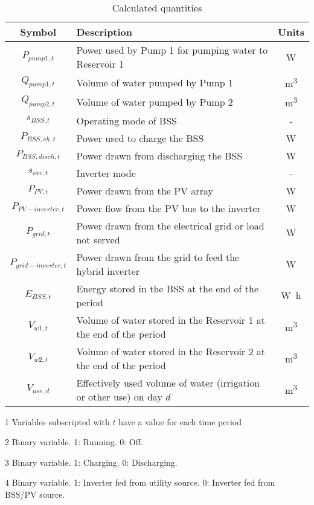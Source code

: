 \begin{table}[htb]
	\begin{threeparttable}[b]
		\caption{Calculated quantities}
		\label{table:calculated}
		\begin{tabular}{cp{}c}
			\toprule 
			Symbol & Description & Units \\
			\midrule
			$P_{pump1,t}$ & Power used by Pump 1 for pumping water to Reservoir 1 & \si{W} \\
			$Q_{pump1,t}$ & Volume of water pumped by Pump 1 & \si{m^3} \\
			$Q_{pump2,t}$ & Volume of water pumped by Pump 2 & \si{m^3} \\
			$s_{BSS,t}$ & Operating mode of BSS\tnote{3} & - \\
			$P_{BSS,ch,t}$ & Power used to charge the BSS & \si{W} \\
			$P_{BSS,disch,t}$ & Power drawn from discharging the BSS & \si{W} \\
			$s_{inv,t}$ & Inverter mode\tnote{4} & - \\
			$P_{PV,t}$ & Power drawn from the PV array & \si{W} \\
			$P_{PV-inverter,t}$ & Power flow from the PV bus to the inverter & \si{W} \\
			$P_{grid,t}$ & Power drawn from the electrical grid or load not served & \si{W} \\
			$P_{grid-inverter,t}$ & Power drawn from the grid to feed the hybrid inverter & \si{W} \\
			$E_{BSS,t}$ & Energy stored in the BSS at the end of the period & \si{W h} \\
			$V_{w1,t}$ & Volume of water stored in the Reservoir 1 at the end of the period & \si{m^3} \\
			$V_{w2,t}$ & Volume of water stored in the Reservoir 2 at the end of the period & \si{m^3} \\
			$V_{use,d}$ & Effectively used volume of water (irrigation or other use) on day $d$ & \si{m^3} \\
			\bottomrule
		\end{tabular}
		\begin{tablenotes}
			\footnotesize
			\item [1] Variables subscripted with $t$ have a value for each time period
			\item [2] Binary variable. 1: Running. 0: Off.
			\item [3] Binary variable. 1: Charging. 0: Discharging.
			\item [4] Binary variable. 1: Inverter fed from utility source. 0: Inverter fed from BSS/PV source.
		\end{tablenotes}
	\end{threeparttable}
\end{table}


